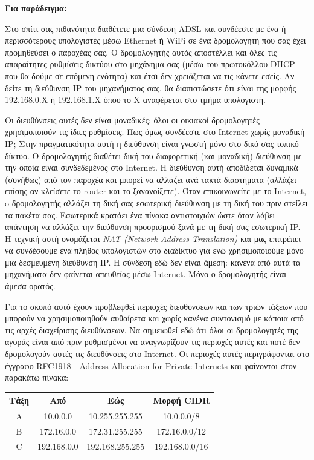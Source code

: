 \begin{inthebox}
\textbf{Για παράδειγμα:}

Στο σπίτι σας πιθανότητα διαθέτετε μια σύνδεση ADSL και συνδέεστε με ένα ή περισσότερους υπολογιστές μέσω Ethernet ή WiFi σε ένα δρομολογητή που σας έχει προμηθεύσει ο παροχέας σας. Ο δρομολογητής αυτός αποστέλλει και όλες τις απαραίτητες ρυθμίσεις δικτύου στο μηχάνημα σας (μέσω του πρωτοκόλλου DHCP που θα δούμε σε επόμενη ενότητα) και έτσι δεν χρειάζεται να τις κάνετε εσείς. Αν δείτε τη διεύθυνση IP του μηχανήματος σας, θα διαπιστώσετε ότι είναι της μορφής 192.168.0.X ή 192.168.1.X όπου το Χ αναφέρεται στο τμήμα υπολογιστή.

Οι διευθύνσεις αυτές δεν είναι μοναδικές: όλοι οι οικιακοί δρομολογητές χρησιμοποιούν τις ίδιες ρυθμίσεις. Πως όμως συνδέεστε στο Internet χωρίς μοναδική IP; Στην πραγματικότητα αυτή η διεύθυνση είναι γνωστή μόνο στο δικό σας τοπικό δίκτυο. Ο δρομολογητής διαθέτει δική του διαφορετική (και μοναδική) διεύθυνση με την οποία είναι συνδεδεμένος στο Internet. Η διεύθυνση αυτή αποδίδεται δυναμικά (συνήθως) από τον παροχέα και μπορεί να αλλάζει ανά τακτά διαστήματα (αλλάζει επίσης αν κλείσετε το router και το ξανανοίξετε). Όταν επικοινωνείτε με το Internet, o δρομολογητής αλλάζει τη δική σας εσωτερική διεύθυνση με τη δική του πριν στείλει τα πακέτα σας. Εσωτερικά κρατάει ένα πίνακα αντιστοιχιών ώστε όταν λάβει απάντηση να αλλάξει την διεύθυνση προορισμού ξανά με τη δική σας εσωτερική IP. Η τεχνική αυτή ονομάζεται \emph{NAT (Network Address Translation)} και μας επιτρέπει να συνδέσουμε ένα πλήθος υπολογιστών στο διαδίκτυο για ενώ χρησιμοποιούμε μόνο μια δεσμευμένη διεύθυνση IP. Η σύνδεση εδώ δεν είναι άμεση: κανένα από αυτά τα μηχανήματα δεν φαίνεται απευθείας μέσω Internet. Μόνο ο δρομολογητής είναι άμεσα ορατός.\\
\end{inthebox}

Για το σκοπό αυτό έχουν προβλεφθεί περιοχές διευθύνσεων και των τριών τάξεων που μπορούν να χρησιμοποιηθούν αυθαίρετα και χωρίς κανένα συντονισμό με κάποια από τις αρχές διαχείρισης διευθύνσεων. Να σημειωθεί εδώ ότι όλοι οι δρομολογητές της αγοράς είναι από πριν ρυθμισμένοι να αναγνωρίζουν τις περιοχές αυτές και ποτέ δεν δρομολογούν αυτές τις διευθύνσεις στο Internet. Οι περιοχές αυτές περιγράφονται στο έγγραφο RFC1918 - Address Allocation for Private Internets και φαίνονται στον παρακάτω πίνακα:

\begin{center}
\begin{tabular}{|c|c|c|c|}
\hline
\textbf{Τάξη} & \textbf{Από} & \textbf{Εώς} & \textbf{Μορφή CIDR} \\
\hline
A & 10.0.0.0 & 10.255.255.255 & 10.0.0.0/8\\
\hline
B & 172.16.0.0 & 172.31.255.255 & 172.16.0.0/12\\
\hline
C & 192.168.0.0 & 192.168.255.255 & 192.168.0.0/16\\
\hline
\end{tabular}
\end{center}

